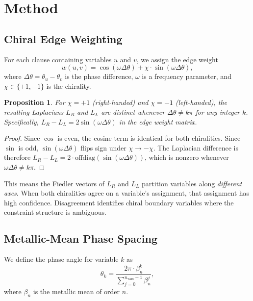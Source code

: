 \documentclass[11pt,a4paper]{article}
\newtheorem{proposition}{Proposition}
\begin{document}
\section{Method}

\subsection{Chiral Edge Weighting}

For each clause containing variables $u$ and $v$, we assign the edge
weight
\begin{equation}\label{eq:chiral-weight}
w(u,v) = \cos(\omega\Delta\theta) + \chi \cdot \sin(\omega\Delta\theta),
\end{equation}
where $\Delta\theta = \theta_u - \theta_v$ is the phase difference,
$\omega$ is a frequency parameter, and $\chi \in \{+1, -1\}$ is the
chirality.

\begin{proposition}
For $\chi = +1$ (right-handed) and $\chi = -1$ (left-handed), the
resulting Laplacians $L_R$ and $L_L$ are distinct whenever
$\Delta\theta \neq k\pi$ for any integer $k$. Specifically,
$L_R - L_L = 2\sin(\omega\Delta\theta)$ in the edge weight matrix.
\end{proposition}

\begin{proof}
Since $\cos$ is even, the cosine term is identical for both chiralities.
Since $\sin$ is odd, $\sin(\omega\Delta\theta)$ flips sign under
$\chi \to -\chi$. The Laplacian difference is therefore
$L_R - L_L = 2 \cdot \text{offdiag}(\sin(\omega\Delta\theta))$,
which is nonzero whenever $\omega\Delta\theta \neq k\pi$.
\end{proof}

This means the Fiedler vectors of $L_R$ and $L_L$ partition variables
along \emph{different axes}. When both chiralities agree on a variable's
assignment, that assignment has high confidence. Disagreement identifies
chiral boundary variables where the constraint structure is ambiguous.

\subsection{Metallic-Mean Phase Spacing}

We define the phase angle for variable $k$ as
\begin{equation}\label{eq:metallic-phase}
\theta_k = \frac{2\pi \cdot \beta_n^k}{\sum_{j=0}^{n_{\text{vars}}-1} \beta_n^j},
\end{equation}
where $\beta_n$ is the metallic mean of order $n$.
\end{document}

